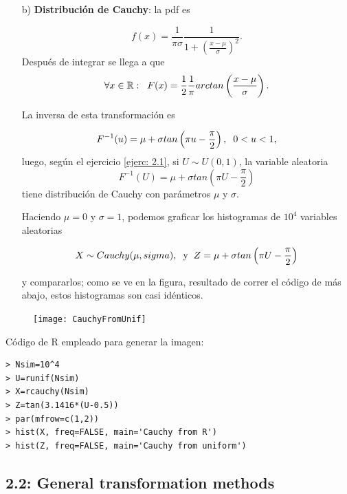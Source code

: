 \begin{itemize}
\item[b)] \textbf{Distribución de Cauchy}: la pdf es

\[
f(x)= \frac{1}{\pi \sigma} \frac{1}{1+ \left( \frac{x-\mu }{\sigma} \right)^{2}}.
\]
Después de integrar se llega a que 
\[
\forall x \in \mathbb{R} : \hspace{0.2cm}
F(x)= \frac{1}{2} \frac{1}{\pi} arctan\left( \frac{x-\mu }{\sigma} \right).
\]

La inversa de esta transformación es 

\[
F^{-1}(u)= \mu + \sigma tan \left( \pi u -\frac{\pi}{2} \right),
\hspace{0.2cm} 0 < u < 1,
\]
luego, 
según el ejercicio \ref{ejerc: 2.1}, si $U \sim U(0,1)$, la variable
aleatoria
\[
F^{-1}(U)= \mu + \sigma tan \left( \pi U -\frac{\pi}{2} \right)
\]
tiene distribución de Cauchy con parámetros $\mu$ y $\sigma$.

Haciendo $\mu=0$ y $\sigma=1$, podemos graficar los histogramas
de $10^4$ variables aleatorias


\begin{equation}
\label{eq0: 2Marz}
X \sim Cauchy (\mu, sigma), \hspace{0.2cm} \text{y}
\hspace{0.2cm} Z= \mu + \sigma tan \left( \pi U -\frac{\pi}{2} \right)
\end{equation}


y compararlos; como se ve en la figura, resultado de correr
el código de más abajo, estos histogramas son casi idénticos.
\end{itemize}



\begin{figure}[H]
\centering
	\texttt{[image: CauchyFromUnif]} 
\end{figure}

Código de R empleado para generar la imagen:
\begin{verbatim}
> Nsim=10^4
> U=runif(Nsim)
> X=rcauchy(Nsim)
> Z=tan(3.1416*(U-0.5))
> par(mfrow=c(1,2))
> hist(X, freq=FALSE, main='Cauchy from R')
> hist(Z, freq=FALSE, main='Cauchy from uniform')
\end{verbatim}
\vspace{0.2cm}



\subsection{2.2: General transformation methods}

